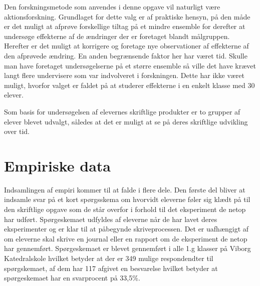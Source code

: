 Den forskningsmetode som anvendes i denne opgave vil naturligt være aktionsforskning. Grundlaget for dette valg er af praktiske hensyn, på den måde er det muligt at afprøve forskellige tiltag på et mindre ensemble for derefter at undersøge effekterne af de ændringer der er foretaget blandt målgruppen. Herefter er det muligt at korrigere og foretage nye observationer af effekterne af den afprøvede ændring. En anden begrænsende faktor her har været tid. Skulle man have foretaget undersøgelserne på et større ensemble så ville det have krævet langt flere undervisere som var indvolveret i forskningen. Dette har ikke været muligt, hvorfor valget er faldet på at studerer effekterne i en enkelt klasse med 30 elever.


Som basis for undersøgelsen af elevernes skriftlige produkter er to grupper af elever blevet udvalgt, således at det er muligt at se på deres skriftlige udvikling over tid. 

\section{Empiriske data}
\label{sec:3.3}

Indsamlingen af empiri kommer til at falde i flere dele. Den første del bliver at indsamle svar på et kort spørgsskema om hvorvidt eleverne føler sig klædt på til den skriftlige opgave som de står overfor i forhold til det eksperiment de netop har udført. Spørgeskemaet udfyldes af eleverne når de har lavet deres eksperimenter og er klar til at påbegynde skriveprocessen. Det er uafhængigt af om eleverne skal skrive en journal eller en rapport om de eksperiment de netop har gennemført. 
Spørgeskemaet er blevet gennemført i alle 1.g klasser på Viborg Katedralskole hvilket betyder at der er 349 mulige respondendter til spørgskemaet, af dem har 117 afgivet en besvarelse hvilket betyder at spørgeskemaet har en svarprocent på 33,5\%. 

